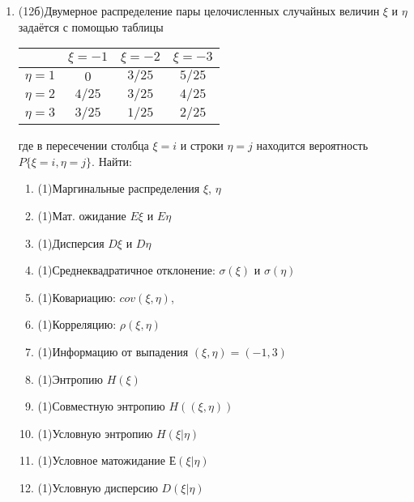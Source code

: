 \documentclass[a4paper, 14pt]{extarticle}
\begin{document}
\begin{enumerate}
\newpage
 \item 
(12б)Двумерное распределение пары целочисленных случайных величин $\xi$ и $\eta$ задаётся с помощью таблицы

\begin{center}
\begin{tabular}{|c|c|c|c|}
\hline
 & $\xi = -1$ & $\xi = -2$ & $\xi = -3$\\
\hline
$\eta = 1$ & $ 0 $ & $3/25$ & $5/25$\\ 
\hline
$\eta = 2$ & $4/25$ & $3/25$ & $4/25$\\ 
\hline
$\eta = 3$ & $3/25$ & $1/25$ & $2/25$\\ 

\hline
\end{tabular}

\end{center}
где в пересечении столбца $\xi = i$ и строки $\eta = j$ находится вероятность $P\lbrace{\xi = i, \eta = j\rbrace}$. Найти:

\begin{enumerate}
    \item (1)Маргинальные распределения $\xi$, $\eta$
    \item (1)Мат. ожидание $E\xi$ и $E\eta$
    \item (1)Дисперсия $D\xi$ и $D\eta$
    \item (1)Среднеквадратичное отклонение: $\sigma(\xi)$ и $\sigma(\eta)$ 
    \item (1)Ковариацию: $cov(\xi, \eta) $,
    \item (1)Корреляцию: $\rho(\xi, \eta)$
    \item (1)Информацию от выпадения $(\xi,\eta)=(-1,3)$
    \item (1)Энтропию $H(\xi)$
    \item (1)Совместную энтропию $H((\xi, \eta))$
    \item (1)Условную энтропию $H(\xi|\eta)$
    \item (1)Условное матожидание $Е(\xi|\eta)$
    \item (1)Условную дисперсию $D(\xi|\eta)$
\end{enumerate}
    


\end{enumerate}
\end{document}
